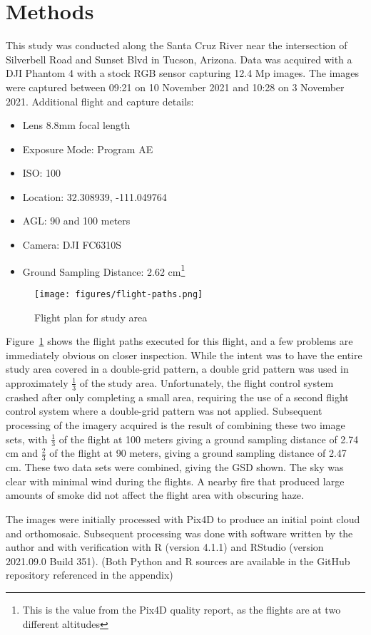 \documentclass[letterpaper]{article}
\begin{document}
\section{Methods}
This study was conducted along the Santa Cruz River near the intersection of Silverbell Road and Sunset Blvd in Tucson, Arizona. Data was acquired with a DJI Phantom 4 with a stock RGB sensor capturing 12.4 Mp images. The images were captured between 09:21 on 10 November 2021 and 10:28 on 3 November 2021. Additional flight and capture details:
\begin{itemize}
\item Lens 8.8mm focal length
\item Exposure Mode: Program AE
\item ISO: 100
\item Location: 32.308939, -111.049764
\item AGL: 90 and 100 meters
\item Camera: DJI FC6310S
\item Ground Sampling Distance: 2.62 cm\footnote{This is the value from the Pix4D quality report, as the flights are at two different altitudes}
\end{itemize}


\begin{figure}[H]
\centering
  \texttt{[image: figures/flight-paths.png]} 
  \caption{Flight plan for study area}
  \label{fig:flight} 
\end{figure}

Figure~\ref{fig:flight} shows the flight paths executed for this flight, and a few problems are immediately obvious on closer inspection. While the intent was to have the entire study area covered in a double-grid pattern, a double grid pattern was used in approximately $\frac {1} {3}$ of the study area. Unfortunately, the flight control system crashed after only completing a small area, requiring the use of a second flight control system where a double-grid pattern was not applied. Subsequent processing of the imagery acquired is the result of combining these two image sets, with $\frac {1} {3}$ of the flight at 100 meters giving a ground sampling distance of 2.74 cm and $\frac {2} {3}$ of the flight at 90 meters, giving a ground sampling distance of 2.47 cm. These two data sets were combined, giving the GSD shown. The sky was clear with minimal wind during the flights. A nearby fire that produced large amounts of smoke did not affect the flight area with obscuring haze.

The images were initially processed with Pix4D to produce an initial point cloud and orthomosaic. Subsequent processing was done with software written by the author and with verification with R (version 4.1.1) and RStudio (version 2021.09.0 Build 351). (Both Python and R sources are available in the GitHub repository referenced in the appendix)
\end{document}
